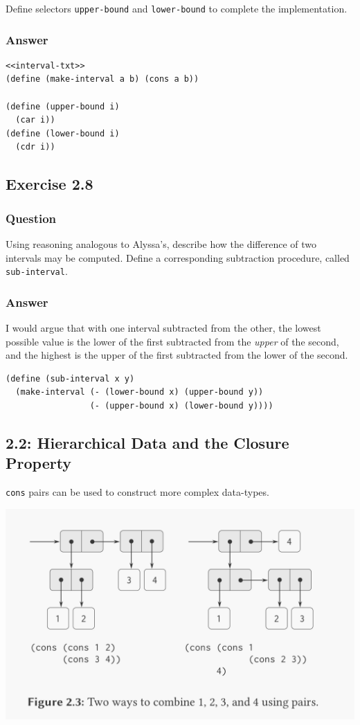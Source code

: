 \documentclass[final,fleqn,titlepage]{article}
\begin{document}
Define selectors \texttt{upper-bound} and \texttt{lower-bound} to complete the
implementation.

\subsubsection{Answer}
\label{sec:orgc0267b4}
\begin{verbatim}
<<interval-txt>>
(define (make-interval a b) (cons a b))

(define (upper-bound i)
  (car i))
(define (lower-bound i)
  (cdr i))
\end{verbatim}

\subsection{Exercise 2.8}
\label{sec:orgc391549}
\subsubsection{Question}
\label{sec:org57cdf8e}
Using reasoning analogous to Alyssa's, describe how the difference of two
intervals may be computed. Define a corresponding subtraction procedure, called
\texttt{sub-interval}.
\subsubsection{Answer}
\label{sec:orge37f926}
I would argue that with one interval subtracted from the other, the lowest
possible value is the lower of the first subtracted from the \emph{upper} of the
second, and the highest is the upper of the first subtracted from the lower of the
second.
\begin{verbatim}
(define (sub-interval x y)
  (make-interval (- (lower-bound x) (upper-bound y))
                 (- (upper-bound x) (lower-bound y))))
\end{verbatim}
\subsection{2.2: Hierarchical Data and the Closure Property}
\label{sec:org8be7fe6}
\texttt{cons} pairs can be used to construct more complex data-types.

\begin{center}
\includegraphics[width=.9\linewidth]{2/cons-cells.jpeg}
\end{center}
\end{document}
